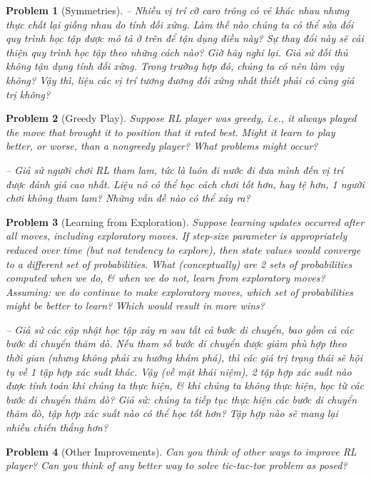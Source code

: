 \documentclass{article}
\newtheorem{problem}{Problem}
\begin{document}
\begin{itemize}
\begin{itemize}
\begin{problem}[Symmetries]
            -- Nhiều vị trí cờ caro trông có vẻ khác nhau nhưng thực chất lại giống nhau do tính đối xứng. Làm thế nào chúng ta có thể sửa đổi quy trình học tập được mô tả ở trên để tận dụng điều này? Sự thay đổi này sẽ cải thiện quy trình học tập theo những cách nào? Giờ hãy nghĩ lại. Giả sử đối thủ không tận dụng tính đối xứng. Trong trường hợp đó, chúng ta có nên làm vậy không? Vậy thì, liệu các vị trí tương đương đối xứng nhất thiết phải có cùng giá trị không?
        \end{problem}

        \begin{problem}[Greedy Play]
            Suppose RL player was greedy, i.e., it always played the move that brought it to position that it rated best. Might it learn to play better, or worse, than a nongreedy player? What problems might occur?

            -- Giả sử người chơi RL tham lam, tức là luôn đi nước đi đưa mình đến vị trí được đánh giá cao nhất. Liệu nó có thể học cách chơi tốt hơn, hay tệ hơn, 1 người chơi không tham lam? Những vấn đề nào có thể xảy ra?
        \end{problem}

        \begin{problem}[Learning from Exploration]
            Suppose learning updates occurred after {\rm all} moves, including exploratory moves. If step-size parameter is appropriately reduced over time (but not tendency to explore), then state values would converge to a different set of probabilities. What  (conceptually) are 2 sets of probabilities computed when we do, \& when we do not, learn from exploratory moves? Assuming: we do continue to make exploratory moves, which set of probabilities might be better to learn? Which would result in more wins?

            -- Giả sử các cập nhật học tập xảy ra sau {\rm tất cả} bước di chuyển, bao gồm cả các bước di chuyển thăm dò. Nếu tham số bước di chuyển được giảm phù hợp theo thời gian (nhưng không phải xu hướng khám phá), thì các giá trị trạng thái sẽ hội tụ về 1 tập hợp xác suất khác. Vậy (về mặt khái niệm), 2 tập hợp xác suất nào được tính toán khi chúng ta thực hiện, \& khi chúng ta không thực hiện, học từ các bước di chuyển thăm dò? Giả sử: chúng ta tiếp tục thực hiện các bước di chuyển thăm dò, tập hợp xác suất nào có thể học tốt hơn? Tập hợp nào sẽ mang lại nhiều chiến thắng hơn?
        \end{problem}

        \begin{problem}[Other Improvements]
            Can you think of other ways to improve RL player? Can you think of any better way to solve tic-tac-toe problem as posed?


\end{problem}
\end{itemize}
\end{itemize}
\end{document}
